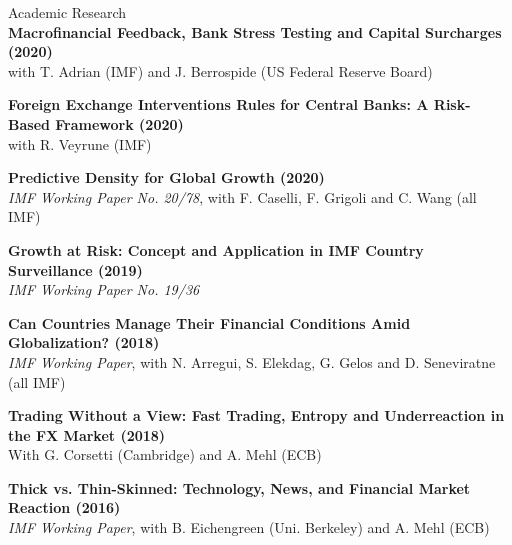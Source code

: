 \documentclass[usegeometry, 10pt, a4paper]{cv} %
\newcommand{\activite}[1]{\textbf{#1}\ }
\begin{document}
\newpage


\begin{rubriquetableau}[0.95\textwidth]{Academic Research}\\

\activite{Macrofinancial Feedback, Bank Stress Testing and Capital Surcharges (2020)} \\
\hspace{0.6cm} \small{with T. Adrian (IMF) and J. Berrospide (US Federal Reserve Board)}
\vspace{0.4cm} 
  
\activite{Foreign Exchange Interventions Rules for Central Banks: A Risk-Based Framework (2020)} \\
\hspace{0.6cm} \small{with R. Veyrune (IMF)}
\vspace{0.4cm} 
  

\activite{Predictive Density for Global Growth (2020)} \\
\hspace{0.6cm} \small{\emph{IMF Working Paper No. 20/78}, with F. Caselli, F. Grigoli and C. Wang (all IMF)}
\vspace{0.4cm} 

  
\activite{Growth at Risk: Concept and Application in IMF Country Surveillance (2019)} \\
\hspace{0.6cm} \small{\emph{IMF Working Paper No. 19/36}}
\vspace{0.4cm} 

\activite{Can Countries Manage Their Financial Conditions Amid Globalization? (2018)} \\
\hspace{0.6cm} \small{\emph{IMF Working Paper}, with N. Arregui, S. Elekdag, G. Gelos and D. Seneviratne (all IMF)}
\vspace{0.4cm} 

\activite{Trading Without a View: Fast Trading, Entropy and Underreaction in the FX  Market (2018)} \\
\hspace{0.6cm} \small{With G. Corsetti (Cambridge) and A. Mehl (ECB)}
\vspace{0.4cm} 


\activite{Thick vs. Thin-Skinned: Technology, News, and Financial Market Reaction (2016)} \\
\hspace{0.6cm} \small{\emph{IMF Working Paper}, with B. Eichengreen (Uni. Berkeley) and A. Mehl (ECB)}
\vspace{0.4cm} 


\end{rubriquetableau}
\end{document}
